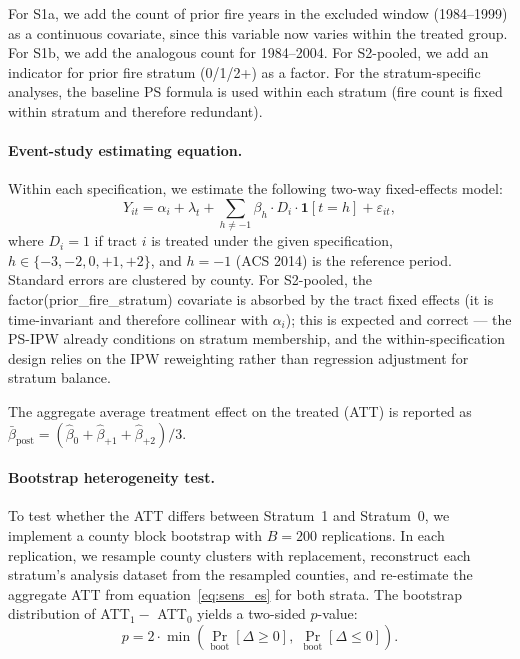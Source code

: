 \documentclass[12pt]{article}
\begin{document}
For S1a, we add the count of prior fire years in the excluded window
(1984--1999) as a continuous covariate, since this variable now varies within
the treated group.
For S1b, we add the analogous count for 1984--2004.
For S2-pooled, we add an indicator for prior fire stratum (0/1/2+) as a factor.
For the stratum-specific analyses, the baseline PS formula is used within each stratum
(fire count is fixed within stratum and therefore redundant).

\paragraph{Event-study estimating equation.}
Within each specification, we estimate the following two-way fixed-effects model:
\begin{equation}
  Y_{it} = \alpha_i + \lambda_t
    + \sum_{h \neq -1} \beta_h \cdot D_i \cdot \mathbf{1}[t = h]
    + \varepsilon_{it},
  \label{eq:sens_es}
\end{equation}
where $D_i = 1$ if tract $i$ is treated under the given specification,
$h \in \{-3, -2, 0, +1, +2\}$, and $h = -1$ (ACS 2014) is the reference period.
Standard errors are clustered by county.
For S2-pooled, the factor(prior\_fire\_stratum) covariate is absorbed by the
tract fixed effects (it is time-invariant and therefore collinear with $\alpha_i$);
this is expected and correct --- the PS-IPW already conditions on stratum membership,
and the within-specification design relies on the IPW reweighting rather than
regression adjustment for stratum balance.

The aggregate average treatment effect on the treated (ATT) is reported as
$\bar{\beta}_{\text{post}} = (\hat{\beta}_0 + \hat{\beta}_{+1} + \hat{\beta}_{+2})/3$.

\paragraph{Bootstrap heterogeneity test.}
To test whether the ATT differs between Stratum~1 and Stratum~0, we implement a
county block bootstrap with $B = 200$ replications.
In each replication, we resample county clusters with replacement, reconstruct each
stratum's analysis dataset from the resampled counties, and re-estimate the aggregate
ATT from equation~\eqref{eq:sens_es} for both strata.
The bootstrap distribution of ATT$_1 -$ ATT$_0$ yields a two-sided $p$-value:
\[
  p = 2 \cdot \min\!\left(
    \Pr_\text{boot}[\Delta \geq 0],\;
    \Pr_\text{boot}[\Delta \leq 0]
  \right).
\]
\end{document}
